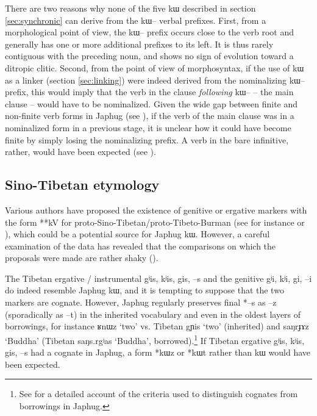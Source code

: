 \documentclass[oldfontcommands,oneside,a4paper,11pt]{article}
\newcommand{\ipa}[1]{{\phon #1}} %
\begin{document}
 There are two reasons why none of the five \ipa{kɯ} described in section \ref{sec:synchronic} can derive from the \ipa{kɯ--} verbal prefixes. First, from a morphological point of view, the \ipa{kɯ--} prefix occurs close to the verb root and generally has one or more additional prefixes to its left. It is thus rarely contiguous with the preceding noun, and shows no sign of evolution toward a ditropic clitic. Second, from the point of view of morphosyntax, if the use of \ipa{kɯ} as a linker (section \ref{sec:linking}) were indeed derived from the nominalizing \ipa{kɯ--} prefix, this would imply that the verb in the clause \textit{following} \ipa{kɯ--} -- the main clause -- would have to be nominalized. Given the wide gap between finite and non-finite verb forms in Japhug (see \citealt[267-272]{jacques14linking}), if the verb of the main clause was in a nominalized form in a previous stage, it is unclear how it could have become finite by simply losing the nominalizing prefix. A verb in the bare infinitive, rather, would have been expected (see  \citealt[7]{jacques14antipassive}).

 

\subsection{Sino-Tibetan etymology}
Various authors have proposed the existence of genitive or ergative markers with the form **\ipa{kV} for proto-Sino-Tibetan/proto-Tibeto-Burman (see for instance \citealt[95-6]{benedict72} or \citealt{delancey84case}), which could be a potential source for Japhug \ipa{kɯ}. However, a careful examination of the data has revealed that the comparisons on which the proposals were made are rather shaky (\citealt{lapolla95ergative}).

The Tibetan ergative / instrumental \ipa{gʲis, kʲis, gis, --s} and the genitive \ipa{gʲi, kʲi, gi, --i} do indeed resemble Japhug \ipa{kɯ}, and it is tempting to suppose that the two markers are cognate. However, Japhug regularly preserves final *\ipa{--s} as \ipa{--z} (sporadically as \ipa{--t}) in the inherited vocabulary and even in the oldest layers of borrowings, for instance \ipa{ʁnɯz} `two'  vs. Tibetan \ipa{gɲis} `two' (inherited) and \ipa{saŋrɟɤz} `Buddha' (Tibetan \ipa{saŋs.rgʲas} `Buddha', borrowed).\footnote{See \citet[83-200]{jacques04these} for a detailed account of the criteria used to distinguish cognates from borrowings in Japhug.} If Tibetan ergative \ipa{gʲis, kʲis, gis, --s} had a cognate in Japhug, a form *\ipa{kɯz} or *\ipa{kɯt} rather than \ipa{kɯ} would have been expected.
\end{document}
